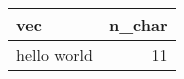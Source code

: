 
\begin{tabular}[t]{lr}
\toprule
vec & n\_char\\
\midrule
hello world & 11\\
\bottomrule
\end{tabular}
